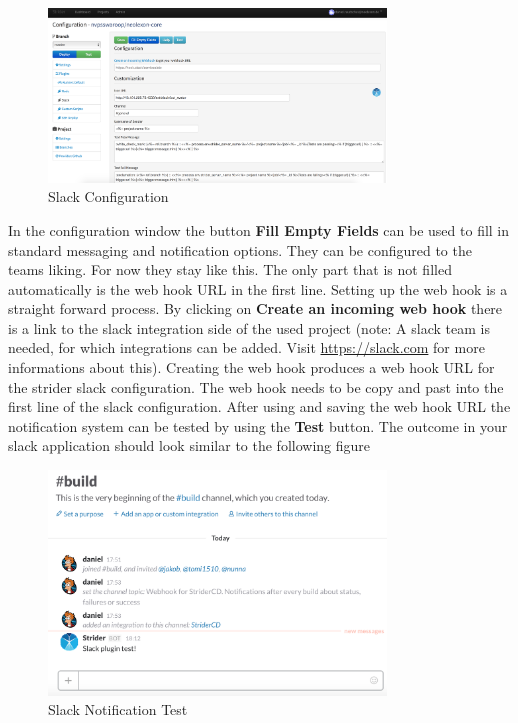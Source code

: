 \begin{figure}[h!]
  \centering
  \includegraphics[width=0.8\textwidth]{images/slack_config.png}
  \caption{Slack Configuration}
\end{figure}

In the configuration window the button \textbf{Fill Empty Fields} can be used to fill in standard messaging and notification options. They can be
configured to the teams liking. For now they stay like this. The only part that is not filled automatically is the web hook URL in the first line.
Setting up the web hook is a straight forward process. By clicking on \textbf{Create an incoming web hook} there is a link to the slack integration
side of the used project (note: A slack team is needed, for which integrations can be added. Visit \url{https://slack.com} for more informations about
this). Creating the web hook produces a web hook URL for the strider slack configuration. The web hook needs to be copy and past into the first line
of the slack configuration. After using and saving the web hook URL the notification system can be tested by using the \textbf{Test} button.
The outcome in your slack application should look similar to the following figure

\begin{figure}[h!]
  \centering
  \includegraphics[width=0.8\textwidth]{images/slack_test.png}
  \caption{Slack Notification Test}
\end{figure}

